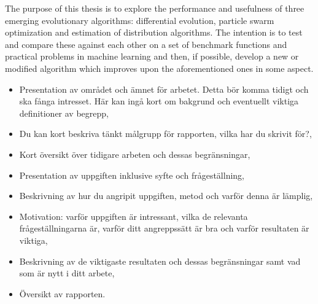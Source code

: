 The purpose of this thesis is to explore the performance and usefulness of three emerging evolutionary algorithms: differential evolution, particle swarm optimization and estimation of distribution algorithms. The intention is to test and compare these against each other on a set of benchmark functions and practical problems in machine learning and then, if possible, develop a new or modified algorithm which improves upon the aforementioned ones in some aspect.

{\color{blue}
\begin{itemize}
\item Presentation av omr\r{a}det och \"amnet f\"or arbetet. Detta b\"or komma tidigt och ska f\r{a}nga intresset. H\"ar kan ing\r{a} kort om bakgrund och eventuellt viktiga definitioner av begrepp,
\item	Du kan kort beskriva t\"ankt m\r{a}lgrupp f\"or rapporten, vilka har du skrivit f\"or?,
\item	Kort \"oversikt \"over tidigare arbeten och dessas begr\"ansningar,
\item	Presentation av uppgiften inklusive syfte och fr\r{a}gest\"allning,
\item	Beskrivning av hur du angripit uppgiften, metod och varf\"or denna \"ar l\"amplig,
\item	Motivation: varf\"or uppgiften \"ar intressant, vilka de relevanta fr\r{a}gest\"allningarna \"ar, varf\"or ditt angreppss\"att \"ar bra och varf\"or resultaten \"ar viktiga,
\item	Beskrivning av de viktigaste resultaten och dessas begr\"ansningar samt vad som \"ar nytt i ditt arbete,
\item	\"Oversikt av rapporten.
\end{itemize}
}

